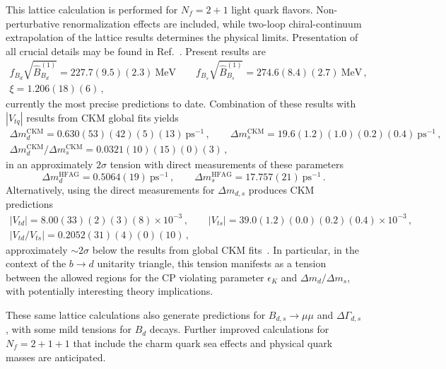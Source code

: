 This lattice calculation is performed for $N_f = 2+1$ light quark flavors. Non-perturbative renormalization effects are included, while two-loop chiral-continuum extrapolation of the lattice results determines the physical limits. Presentation of all crucial details may be found in Ref.~\cite{Bazavov:2016nty}. Present results are
\begin{gather}
	f_{B_d}\sqrt{\hat{B}^{(1)}_{B_d}} = 227.7(9.5)(2.3)~\text{MeV} \qquad f_{B_s}\sqrt{\hat{B}^{(1)}_{B_s}} = 274.6(8.4)(2.7)~\text{MeV}\,,\nonumber\\
		\xi = 1.206(18)(6)\,,
\end{gather}
currently the most precise predictions to date. Combination of these results with $|V_{tq}|$ results from CKM global fits yields 
\begin{gather}
	\Delta m^{\text{CKM}}_d = 0.630(53)(42)(5)(13)~\text{ps}^{-1}\,, \qquad \Delta m^{\text{CKM}}_s = 19.6(1.2)(1.0)(0.2)(0.4)~\text{ps}^{-1}\,,\nonumber \\
	\Delta m^{\text{CKM}}_d/\Delta m^{\text{CKM}}_s = 0.0321(10)(15)(0)(3)\,,
\end{gather}
in an approximately $2\sigma$ tension with direct measurements of these parameters \cite{HFAG}
\begin{equation}
	\Delta m^{\text{HFAG}}_d = 0.5064(19)~\text{ps}^{-1}\,,\qquad \Delta m^{\text{HFAG}}_s = 17.757(21)~\text{ps}^{-1}\,.
\end{equation}
Alternatively, using the direct measurements for $\Delta m_{d,s}$ produces CKM predictions
\begin{gather}
	|V_{td}| = 8.00(33)(2)(3)(8)\times 10^{-3}\,,\qquad |V_{ts}| = 39.0(1.2)(0.0)(0.2)(0.4)\times 10^{-3}\,,\nonumber\\
	|V_{td}/V_{ts}| = 0.2052(31)(4)(0)(10)\,,
\end{gather}
approximately $\sim2\sigma$ below the results from global CKM fits~\cite{Charles:2004jd, Charles:2015gya}. In particular, in the context of the $b \to d$ unitarity triangle, this tension manifests as a tension between the allowed regions for the CP violating parameter $\epsilon_K$ and $\Delta m_{d}/\Delta m_s$, with potentially interesting theory implications. 

These same lattice calculations also generate predictions for $B_{d,s} \to \mu\mu$ and $\Delta\Gamma_{d,s}$, with some mild tensions for $B_d$ decays. Further improved calculations for $N_f = 2 + 1 + 1$ that include the charm quark sea effects and physical quark masses are anticipated.

